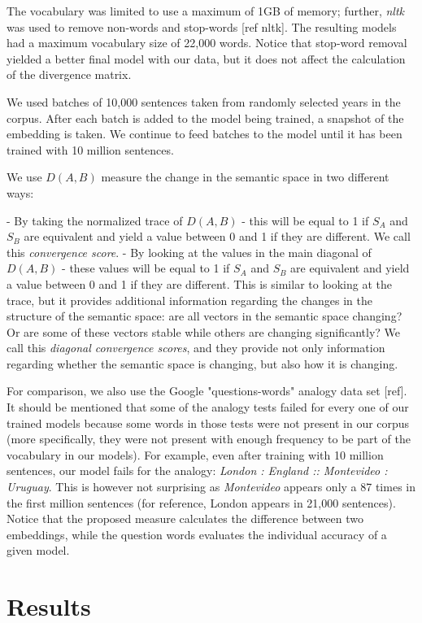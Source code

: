 \documentclass{article} %
\begin{document}
The vocabulary was limited to use a maximum of 1GB of memory; further, \textit{nltk} was used to remove non-words and stop-words [ref nltk]. The resulting models had a maximum vocabulary size of 22,000 words. Notice that stop-word removal yielded a better final model with our data, but it does not affect the calculation of the divergence matrix.

We used batches of 10,000 sentences taken from randomly selected years in the corpus. After each batch is added to the model being trained, a snapshot of the embedding is taken. We continue to feed batches to the model until it has been trained with 10 million sentences.

We use $D(A,B)$ measure the change in the semantic space in two different ways:

 - By taking the normalized trace of $D(A,B)$ - this will be equal to 1 if $S_A$ and $S_B$ are equivalent and yield a value between 0 and 1 if they are different. We call this \textit{convergence score}.
 - By looking at the values in the main diagonal of $D(A,B)$ - these values will be equal to 1 if $S_A$ and $S_B$ are equivalent and yield a value between 0 and 1 if they are different. This is similar to looking at the trace, but it provides additional information regarding the changes in the structure of the semantic space: are all vectors in the semantic space changing? Or are some of these vectors stable while others are changing significantly? We call this \textit{diagonal convergence scores}, and they provide not only information regarding whether the semantic space is changing, but also how it is changing.

For comparison, we also use the Google "questions-words" analogy data set [ref]. It should be mentioned that some of the analogy tests failed for every one of our trained models because some words in those tests were not present in our corpus (more specifically, they were not present with enough frequency to be part of the vocabulary in our models). For example, even after training with 10 million sentences, our model fails for the analogy: \textit{London : England :: Montevideo : Uruguay}. This is however not surprising as \textit{Montevideo} appears only a 87 times in the first million sentences (for reference, London appears in 21,000 sentences). Notice that the proposed measure calculates the difference between two embeddings, while the question words evaluates the individual accuracy of a given model.

\section{Results}
\label{sec:results}
\end{document}
